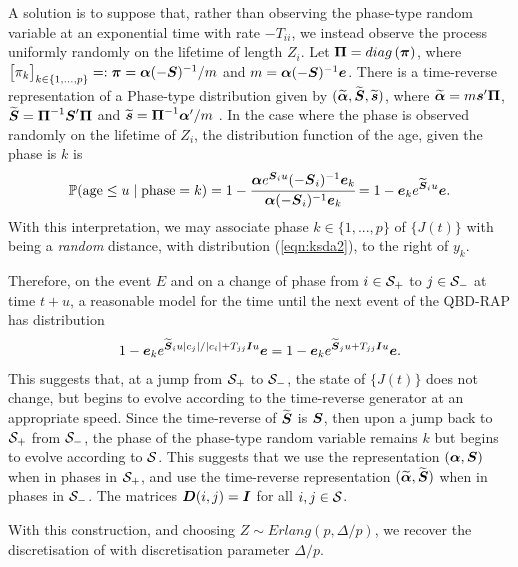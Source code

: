 A solution is to suppose that, rather than observing the phase-type random variable at an exponential time with rate \(-T_{ii}\), we instead observe the process uniformly randomly on the lifetime of length \(Z_i\). Let \(\boldsymbol \Pi = diag\left(\boldsymbol \pi \right)\), where \(\begin{bmatrix} \pi_k \end{bmatrix}_{k\in\{1,\dots,p\}}=:\boldsymbol \pi=\boldsymbol \alpha (-\boldsymbol{S})^{-1}/m\) and \(m=\boldsymbol \alpha (-\boldsymbol{S})^{-1}\boldsymbol e\). There is a time-reverse representation of a Phase-type distribution given by \((\widetilde{\boldsymbol \alpha}, \widetilde{\boldsymbol S}, \widetilde{\boldsymbol s})\), where \(\widetilde{\boldsymbol \alpha} = m\boldsymbol s' \boldsymbol \Pi \), \(\widetilde{\boldsymbol S} = \boldsymbol\Pi^{-1}\boldsymbol S'\boldsymbol \Pi\) and \(\widetilde{\boldsymbol s} = \boldsymbol \Pi^{-1}\boldsymbol \alpha'/m\) \cite[Page 91]{a2008}. In the case where the phase is observed randomly on the lifetime of \(Z_i\), the distribution function of the age, given the phase is \(k\) is \cite[Lemma 3.1]{hmp2017}
\begin{align}\mathbb P(\mbox{age}\leq u \mid \mbox{phase}=k) = 1-\cfrac{\boldsymbol \alpha e^{\boldsymbol S_iu}(-\boldsymbol S_i)^{-1}\boldsymbol e_k}{\boldsymbol \alpha (-\boldsymbol S_i)^{-1}\boldsymbol e_k} = 1- \boldsymbol e_k e^{\widetilde{ \boldsymbol S}_iu}\boldsymbol e.\label{eqn:ksda2}\end{align}
With this interpretation, we may associate phase \(k\in\{1,...,p\}\) of \(\{J(t)\}\) with being a \emph{random} distance, with distribution (\ref{eqn:ksda2}), to the right of \(y_k\).

Therefore, on the event \(E\) and on a change of phase from \(i\in\mathcal{S}_+\) to \(j\in\mathcal{S}_-\) at time \(t+u\), a reasonable model for the time until the next event of the QBD-RAP has distribution 
\begin{align}
	1- \boldsymbol e_k e^{\widetilde{ \boldsymbol S}_iu|c_j|/|c_i| + T_{jj}\boldsymbol Iu}\boldsymbol e = 1- \boldsymbol e_k e^{\widetilde{ \boldsymbol S}_ju+ T_{jj}\boldsymbol Iu}\boldsymbol e.\label{eqn:ksda3}
\end{align}
This suggests that, at a jump from \(\mathcal{S}_+\) to \(\mathcal{S}_-\), the state of \(\{J(t)\}\) does not change, but begins to evolve according to the time-reverse generator at an appropriate speed. Since the time-reverse of \(\widetilde{\boldsymbol S}\) is \(\boldsymbol S\), then upon a jump back to \(\mathcal{S}_+\) from \(\mathcal{S}_-\), the phase of the phase-type random variable remains \(k\) but begins to evolve according to \(\mathcal{S}\). This suggests that we use the representation \((\boldsymbol \alpha, \boldsymbol S)\) when in phases in \(\mathcal{S}_+\), and use the time-reverse representation \((\widetilde{\boldsymbol \alpha}, \widetilde{\boldsymbol S})\) when in phases in \(\mathcal{S}_-\). The matrices \(\boldsymbol D(i,j)=\boldsymbol I\) for all \(i,j\in\mathcal{S}\). 

With this construction, and choosing \(Z\sim Erlang(p,\Delta/p)\), we recover the discretisation of \cite{bo2013} with discretisation parameter \(\Delta/p\).

